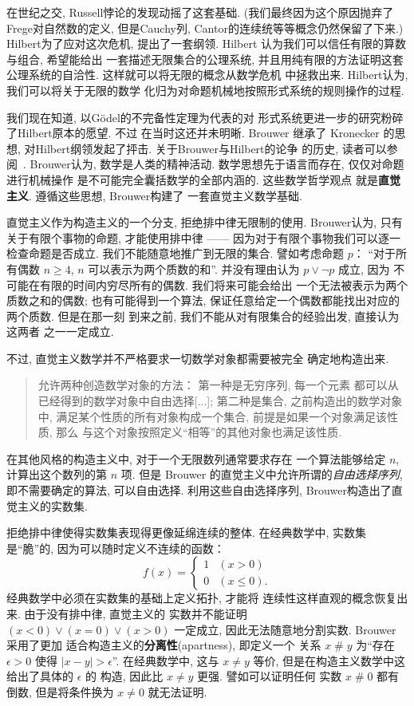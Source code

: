 \documentclass[UTF8]{ctexbook}
\theoremstyle{plain}
\theoremstyle{definition}
\theoremstyle{remark}
\begin{document}
在世纪之交, Russell悖论的发现动摇了这套基础.
(我们最终因为这个原因抛弃了Frege对自然数的定义,
但是Cauchy列, Cantor的连续统等等概念仍然保留了下来.)
Hilbert为了应对这次危机, 提出了一套纲领. Hilbert
认为我们可以信任有限的算数与组合, 希望能给出
一套描述无限集合的公理系统, 并且用纯有限的方法证明这套
公理系统的自洽性. 这样就可以将无限的概念从数学危机
中拯救出来. Hilbert认为, 我们可以将关于无限的数学
化归为对命题机械地按照形式系统的规则操作的过程.

我们现在知道, 以G\"odel的不完备性定理为代表的对
形式系统更进一步的研究粉碎了Hilbert原本的愿望. 不过
在当时这还并未明晰. Brouwer 继承了 Kronecker 的思想,
对Hilbert纲领发起了抨击. 关于Brouwer与Hilbert的论争
的历史, 读者可以参阅~\cite{carl:1998:brouwer}.
Brouwer认为, 数学是人类的精神活动.
数学思想先于语言而存在, 仅仅对命题进行机械操作
是不可能完全囊括数学的全部内涵的. 这些数学哲学观点
就是\textbf{直觉主义}. 遵循这些思想, Brouwer构建了
一套直觉主义数学基础.

直觉主义作为构造主义的一个分支, 拒绝排中律无限制的使用.
Brouwer认为, 只有关于有限个事物的命题, 才能使用排中律
------ 因为对于有限个事物我们可以逐一检查命题是否成立.
我们不能随意地推广到无限的集合. 譬如考虑命题 \(p\)：
“对于所有偶数 \(n \ge 4\), \(n\) 可以表示为两个质数的和”.
并没有理由认为 \(p \vee \neg p\) 成立, 因为
不可能在有限的时间内穷尽所有的偶数. 我们将来可能会给出
一个无法被表示为两个质数之和的偶数; 也有可能得到一个算法,
保证任意给定一个偶数都能找出对应的两个质数. 但是在那一刻
到来之前, 我们不能从对有限集合的经验出发, 直接认为这两者
之一一定成立.

不过, 直觉主义数学并不严格要求一切数学对象都需要被完全
确定地构造出来.
\begin{quotation}
允许两种创造数学对象的方法： 第一种是无穷序列, 每一个元素
都可以从已经得到的数学对象中自由选择[...]; 第二种是集合,
之前构造出的数学对象中, 满足某个性质的所有对象构成一个集合,
前提是如果一个对象满足该性质, 那么
与这个对象按照定义“相等”的其他对象也满足该性质.~\cite{brouwer:1981:intuitionism}
\end{quotation}
在其他风格的构造主义中, 对于一个无限数列通常要求存在
一个算法能够给定 \(n\), 计算出这个数列的第 \(n\) 项.
但是 Brouwer 的直觉主义中允许所谓的\emph{自由选择序列},
即不需要确定的算法, 可以自由选择. 利用这些自由选择序列,
Brouwer构造出了直觉主义的实数集.

拒绝排中律使得实数集表现得更像延绵连续的整体. 在经典数学中,
实数集是“脆”的, 因为可以随时定义不连续的函数：
\[f(x) = \begin{cases}
1 & (x > 0)\\
0 & (x \le 0).
\end{cases}\]
经典数学中必须在实数集的基础上定义拓扑, 才能将
连续性这样直观的概念恢复出来. 由于没有排中律, 直觉主义的
实数并不能证明 \((x < 0) \vee (x = 0) \vee (x > 0)\)
一定成立, 因此无法随意地分割实数. Brouwer 采用了更加
适合构造主义的\textbf{分离性}(apartness), 即定义一个
关系 \(x \mathop{\#} y\) 为“存在 \(\epsilon > 0\)
使得 \(|x - y| > \epsilon\)”. 在经典数学中, 这与
\(x \ne y\) 等价, 但是在构造主义数学中这给出了具体的 \(\epsilon\) 的
构造, 因此比 \(x \ne y\) 更强. 譬如可以证明任何
实数 \(x \mathop{\#} 0\) 都有倒数, 但是将条件换为
\(x \ne 0\) 就无法证明.
\end{document}
